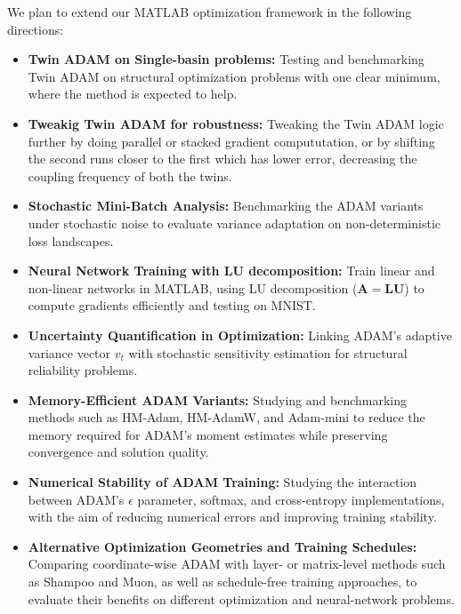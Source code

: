 \documentclass[11pt,a4paper]{article}
\newcommand{\added}[1]{#1}
\begin{document}
We plan to extend our MATLAB optimization framework in the following directions:
\begin{itemize}
    \item \added{\textbf{Twin ADAM on Single-basin problems:} Testing and benchmarking Twin ADAM on structural optimization problems with one clear minimum, where the method is expected to help.}
    \item \added{\textbf{Tweakig Twin ADAM for robustness:}  Tweaking the Twin ADAM logic further by doing parallel or stacked gradient compututation,  or by shifting the second runs closer to the first which has lower error, decreasing the coupling frequency of both the twins. }
    \item \added{\textbf{Stochastic Mini-Batch Analysis:} Benchmarking the ADAM variants under stochastic noise to evaluate variance adaptation on non-deterministic loss landscapes.}
    \item \textbf{Neural Network Training with LU decomposition:} Train linear and non-linear networks in MATLAB, using LU decomposition ($\mathbf{A} = \mathbf{L}\mathbf{U}$) to compute gradients efficiently and testing on MNIST.
    \item \added{\textbf{Uncertainty Quantification in Optimization:} Linking ADAM's adaptive variance vector $v_t$ with stochastic sensitivity estimation for structural reliability problems.}
    \item \added{\textbf{Memory-Efficient ADAM Variants:} Studying and benchmarking methods such as HM-Adam, HM-AdamW, and Adam-mini to reduce the memory required for ADAM's moment estimates while preserving convergence and solution quality.}
    \item \added{\textbf{Numerical Stability of ADAM Training:} Studying the interaction between ADAM's $\epsilon$ parameter, softmax, and cross-entropy implementations, with the aim of reducing numerical errors and improving training stability.}
    \item \added{\textbf{Alternative Optimization Geometries and Training Schedules:} Comparing coordinate-wise ADAM with layer- or matrix-level methods such as Shampoo and Muon, as well as schedule-free training approaches, to evaluate their benefits on different optimization and neural-network problems.}
\end{itemize}



\end{document}
